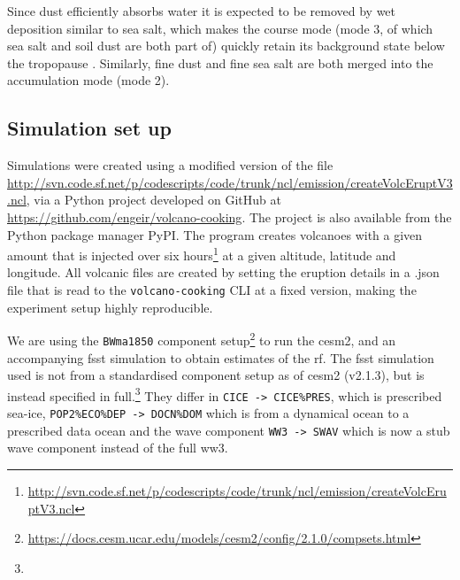 \documentclass{ametsocV5}
\begin{document}
Since dust efficiently absorbs water it is expected to be removed by wet deposition
similar to sea salt, which makes the course mode (mode 3, of which sea salt and soil
dust are both part of) quickly retain its background state below the tropopause
\citep{liu2012}. Similarly, fine dust and fine sea salt are both merged into the
accumulation mode (mode 2).


\subsection{Simulation set up}

Simulations were created using a modified version of the file
\url{http://svn.code.sf.net/p/codescripts/code/trunk/ncl/emission/createVolcEruptV3.ncl},
via a Python project developed on GitHub at
\url{https://github.com/engeir/volcano-cooking}. The project is also available from the
Python package manager PyPI. The program creates volcanoes with a given  amount
that is injected over six
hours\footnote{\url{http://svn.code.sf.net/p/codescripts/code/trunk/ncl/emission/createVolcEruptV3.ncl}}
at a given altitude, latitude and longitude. All volcanic  files are created by
setting the eruption details in a .json file that is read to the
\texttt{volcano-cooking} CLI at a fixed version, making the experiment setup highly
reproducible.

We are using the \texttt{BWma1850} component
setup\footnote{\url{https://docs.cesm.ucar.edu/models/cesm2/config/2.1.0/compsets.html}}
to run the \ac{cesm2}, and an accompanying \ac{fsst}
simulation to obtain estimates of the \ac{rf}. The \ac{fsst} simulation used is not from
a standardised component setup as of \ac{cesm2} (v2.1.3), but is instead specified in
full.\footnote{\fssturl}
%
They differ in \texttt{CICE -> CICE\%PRES}, which is prescribed sea-ice,
\texttt{POP2\%ECO\%DEP -> DOCN\%DOM} which is from a dynamical ocean to a prescribed
data ocean and the wave component \texttt{WW3 -> SWAV} which is now a stub wave
component instead of the full \ac{ww3}.
\end{document}

